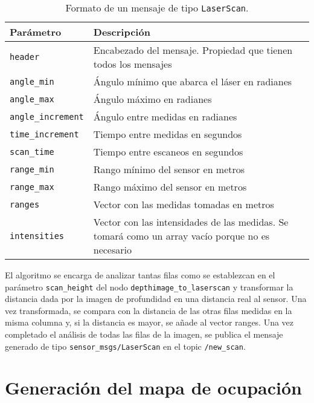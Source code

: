 \begin{table}[H]
\begin{center}
\begin{tabular}{| w{c}{4cm} | m{6.5cm} |}
	\hline
	Parámetro & Descripción \\ \hline
	\texttt{header} & Encabezado del mensaje. Propiedad que tienen todos los mensajes \\ \hline
	\texttt{angle\_min} & Ángulo mínimo que abarca el láser en radianes \\ \hline
	\texttt{angle\_max} & Ángulo máximo en radianes \\ \hline
	\texttt{angle\_increment} & Ángulo entre medidas en radianes \\ \hline
	\texttt{time\_increment} & Tiempo entre medidas en segundos \\ \hline
	\texttt{scan\_time} & Tiempo entre escaneos en segundos \\ \hline
	\texttt{range\_min} & Rango mínimo del sensor en metros \\ \hline
	\texttt{range\_max} & Rango máximo del sensor en metros \\ \hline
	\texttt{ranges} & Vector con las medidas tomadas en metros \\ \hline
	\texttt{intensities} & Vector con las intensidades de las medidas. Se tomará como un array vacío porque no es necesario \\ \hline
\end{tabular}
\caption{Formato de un mensaje de tipo \texttt{LaserScan}.}
\label{tab:laserscan_msg}
\end{center}
\end{table} 

El algoritmo se encarga de analizar tantas filas como se establezcan en el parámetro \texttt{scan\_height} del nodo \texttt{depthimage\_to\_laserscan} y transformar la distancia dada por la imagen de profundidad en una distancia real al sensor. Una vez transformada, se compara con la distancia de las otras filas medidas en la misma columna y, si la distancia es mayor, se añade al vector ranges. Una vez completado el análisis de todas las filas de la imagen, se publica el mensaje generado de tipo \texttt{sensor\_msgs/LaserScan} en el topic \texttt{/new\_scan}.\\

\section{Generación del mapa de ocupación} \label{mapa_ocup}

